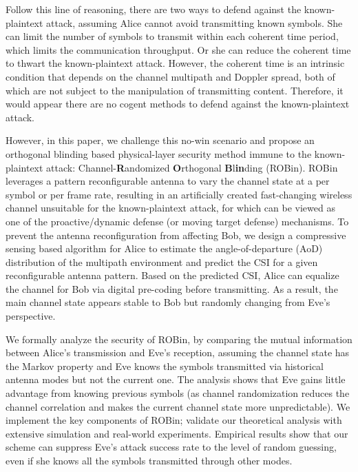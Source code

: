 Follow this line of reasoning, there are two ways to defend against the known-plaintext attack, assuming Alice cannot avoid transmitting known symbols. She can limit the number of symbols to transmit within each coherent time period, which limits the communication throughput. Or she can reduce the coherent time to thwart the known-plaintext attack. However, the coherent time is an intrinsic condition that depends on the channel multipath and Doppler spread, both of which are not subject to the manipulation of transmitting content. Therefore, it would appear there are no cogent methods to defend against the known-plaintext attack.

However, in this paper, we challenge this no-win scenario and propose an orthogonal blinding based physical-layer security method immune to the known-plaintext attack: Channel-\textbf{R}andomized \textbf{O}rthogonal \textbf{B}l\textbf{in}ding (ROBin). ROBin leverages a pattern reconfigurable antenna to vary the channel state at a per symbol or per frame rate, resulting in an artificially created fast-changing wireless channel unsuitable for the known-plaintext attack, for which can be viewed as one of the proactive/dynamic defense (or moving target defense) mechanisms. To prevent the antenna reconfiguration from affecting Bob, we design a compressive sensing based algorithm for Alice to estimate the angle-of-departure (AoD) distribution of the multipath environment and predict the CSI for a given reconfigurable antenna pattern. Based on the predicted CSI, Alice can equalize the channel for Bob via digital pre-coding before transmitting. As a result, the main channel state appears stable  to Bob but randomly changing from Eve's perspective.

We formally analyze the security of ROBin, by comparing the mutual information between Alice's transmission and Eve's reception, assuming the channel state has the Markov property and Eve knows the symbols transmitted via historical antenna modes but not the current one. The analysis shows that Eve gains little advantage from knowing previous symbols (as channel randomization reduces the channel correlation  and makes  the current channel state more unpredictable). We implement the key components of ROBin; validate    our theoretical analysis with extensive simulation and real-world experiments. Empirical results show that our scheme can suppress Eve's attack success rate to the level of random guessing, even if she knows all the symbols transmitted through other modes.

